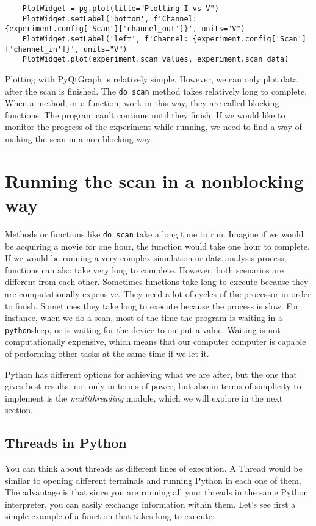 \begin{verbatim}
    PlotWidget = pg.plot(title="Plotting I vs V")
    PlotWidget.setLabel('bottom', f'Channel: {experiment.config['Scan']['channel_out']}', units="V")
    PlotWidget.setLabel('left', f'Channel: {experiment.config['Scan']['channel_in']}', units="V")
    PlotWidget.plot(experiment.scan_values, experiment.scan_data)
\end{verbatim}

Plotting with PyQtGraph is relatively simple. However, we can only plot data after the scan is finished. The \texttt{do\_scan} method takes relatively long to complete. When a method, or a function, work in this way, they are called blocking functions. The program can't continue until they finish. If we would like to monitor the progress of the experiment while running, we need to find a way of making the scan in a non-blocking way.

\section{Running the scan in a nonblocking way}\label{section:nonblocking}

Methods or functions like \texttt{do_scan} take a long time to run. Imagine if we would be acquiring a movie for one hour, the function would take one hour to complete. If we would be running a very complex simulation or data analysis process, functions can also take very long to complete. However, both scenarios are different from each other. Sometimes functions take long to execute because they are computationally expensive. They need a lot of cycles of the processor in order to finish. Sometimes they take long to execute because the process is slow. For instance, when we do a scan, most of the time the program is waiting in a \texttt{python}{sleep}, or is waiting for the device to output a value. Waiting is not computationally expensive, which means that our computer computer is capable of performing other tasks at the same time if we let it.

Python has different options for achieving what we are after, but the one that gives best results, not only in terms of power, but also in terms of simplicity to implement is the \emph{multithreading} module, which we will explore in the next section.

\subsection{Threads in Python}\label{subsection:multithreading}
You can think about threads as different lines of execution. A Thread
would be similar to opening different terminals and running Python in
each one of them. The advantage is that since you are running all your
threads in the same Python interpreter, you can easily exchange
information within them. Let's see first a simple example of a function that takes long to execute:


